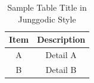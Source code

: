 \begin{table}[h]
\caption{Sample Table Title in Junggodic Style}
\centering
\begin{tabular}{|c|c|}
\hline
Item & Description \\
\hline
A & Detail A \\
B & Detail B \\
\hline
\end{tabular}
\end{table}